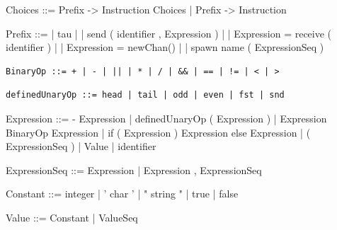 \documentclass[11pt]{report}
\begin{document}
\begin{verbnobox}[\normalfont]
Choices ::= Prefix -> { Instruction } Choices | Prefix -> { Instruction }
\end{verbnobox}
\vspace*{3pt}

\begin{verbnobox}[\normalfont]
Prefix ::= | tau
         | | send ( identifier , Expression )
         | | Expression = receive ( identifier )
         | | Expression = newChan()
         | | spawn name ( ExpressionSeq )
\end{verbnobox}
\vspace*{3pt}

\begin{Verbatim}[fontfamily=textsf]
BinaryOp ::= + | - | || | * | / | && | == | != | < | >
\end{Verbatim}

\vspace*{3pt}
\begin{Verbatim}[fontfamily=textsf]
definedUnaryOp ::= head | tail | odd | even | fst | snd
\end{Verbatim}
\vspace*{3pt}

\begin{verbnobox}[\normalfont]
Expression ::= - Expression
               | definedUnaryOp ( Expression )
               | Expression BinaryOp Expression
               | if ( Expression ) { Expression } else { Expression }
               | ( ExpressionSeq )
               | Value
               | identifier
\end{verbnobox}
\vspace*{3pt}

\begin{verbnobox}[\normalfont]
ExpressionSeq ::= Expression | Expression , ExpressionSeq
\end{verbnobox}
\vspace*{3pt}

\begin{verbnobox}[\normalfont]
Constant ::= integer
             | ' char '
             | " string "
             | true
             | false
\end{verbnobox}
\vspace*{3pt}

\begin{verbnobox}[\normalfont]
Value ::= Constant | { ValueSeq }
\end{verbnobox}
\vspace*{3pt}
\end{document}
